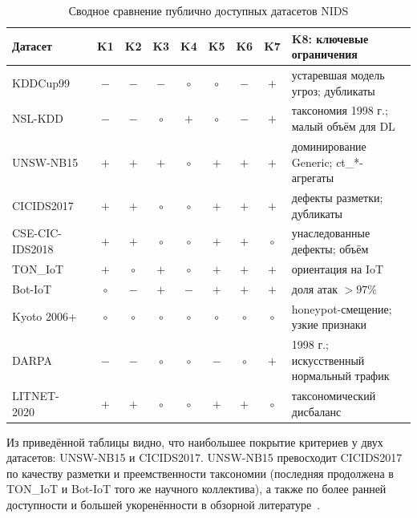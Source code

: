 \begin{table}[H]
\centering
\caption{Сводное сравнение публично доступных датасетов NIDS}
\label{tab:datasets-compare}
\renewcommand{\arraystretch}{1.2}
\setlength{\tabcolsep}{4pt}
\small
\begin{tabularx}{\linewidth}{@{}lcccccccX@{}}
\toprule
\textbf{Датасет} & \textbf{K1} & \textbf{K2} & \textbf{K3} & \textbf{K4} &
\textbf{K5} & \textbf{K6} & \textbf{K7} & \textbf{K8: ключевые ограничения} \\
\midrule
KDDCup99~\cite{tavallaee2009nslkdd}            & $-$    & $-$ & $-$ & $\circ$ & $\circ$ & $-$    & $+$ & устаревшая модель угроз; дубликаты \\
NSL-KDD~\cite{tavallaee2009nslkdd}             & $-$    & $-$ & $\circ$ & $+$ & $\circ$ & $-$    & $+$ & таксономия 1998 г.; малый объём для DL \\
UNSW-NB15~\cite{moustafa2015unsw}              & $+$    & $+$ & $+$ & $\circ$ & $+$    & $+$    & $+$ & доминирование Generic; ct\_*-агрегаты \\
CICIDS2017~\cite{sharafaldin2018toward}        & $+$    & $+$ & $\circ$ & $\circ$ & $+$    & $+$    & $+$ & дефекты разметки; дубликаты \\
CSE-CIC-IDS2018~\cite{sharafaldin2018toward}   & $+$    & $+$ & $\circ$ & $\circ$ & $+$    & $+$    & $\circ$ & унаследованные дефекты; объём \\
TON\_IoT~\cite{moustafa2021toniot}             & $+$    & $\circ$ & $+$ & $\circ$ & $+$    & $+$    & $+$ & ориентация на IoT \\
Bot-IoT~\cite{koroniotis2019botiot}            & $\circ$& $-$ & $+$ & $-$    & $+$    & $+$    & $+$ & доля атак $>97\%$ \\
Kyoto 2006+~\cite{song2011kyoto}               & $\circ$& $\circ$ & $\circ$ & $\circ$ & $\circ$ & $\circ$ & $\circ$ & honeypot-смещение; узкие признаки \\
DARPA~\cite{lippmann2000darpa}                 & $-$    & $-$ & $\circ$ & $\circ$ & $-$    & $\circ$ & $+$ & 1998 г.; искусственный нормальный трафик \\
LITNET-2020~\cite{damasevicius2020litnet}      & $+$    & $+$ & $\circ$ & $\circ$ & $+$    & $+$    & $\circ$ & таксономический дисбаланс \\
\bottomrule
\end{tabularx}
\end{table}

Из приведённой таблицы видно, что наибольшее покрытие критериев у двух
датасетов: UNSW-NB15 и CICIDS2017. UNSW-NB15 превосходит CICIDS2017 по
качеству разметки и преемственности таксономии (последняя продолжена в
TON\_IoT и Bot-IoT того же научного коллектива), а также по более ранней
доступности и большей укоренённости в обзорной
литературе~\cite{khraisat2019survey, ahmad2021nids, ferrag2020dlcyber}.

